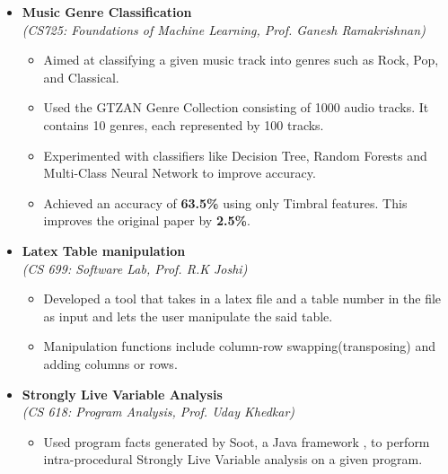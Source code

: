 \documentclass[a4paper,10pt]{article}
\newcommand{\isep}{-2 pt}
\begin{document}
\begin{itemize}
\item \textbf{Music Genre Classification}
\\ {\emph{(CS725: Foundations of Machine Learning, Prof. Ganesh Ramakrishnan)}}
    \\ [-0.6cm]
    \begin{itemize}\itemsep \isep
    \item Aimed at classifying a given music track into genres such as Rock, Pop, and Classical.
    \item Used the GTZAN Genre Collection consisting of 1000 audio tracks.   It contains 10 genres, each represented by 100 tracks.
    \item Experimented with classifiers like Decision Tree, Random Forests and Multi-Class Neural Network to improve accuracy.
    \item Achieved an accuracy of \textbf{63.5\%} using only Timbral features.  This improves the original paper by \textbf{2.5\%}.
    \end{itemize}
    
\item \textbf{Latex Table manipulation}
\\ {\emph{(CS 699: Software Lab, Prof. R.K Joshi)}}
    \\ [-0.6cm]
    \begin{itemize}\itemsep \isep
    \item Developed a tool that takes in a latex file and a table number in the file as input and lets the user manipulate the said table.
    \item Manipulation functions include column-row swapping(transposing) and adding columns or rows.
    \end{itemize}
    
\item \textbf{Strongly Live Variable Analysis}
\\ {\emph{(CS 618: Program Analysis, Prof. Uday Khedkar)}}
    \\ [-0.6cm]
    \begin{itemize}\itemsep \isep
    \item Used program facts generated by Soot, a Java framework , to perform intra-procedural Strongly Live Variable analysis on a given program.
    \end{itemize}

\end{itemize}
\vspace{0.1cm}
\end{document}
